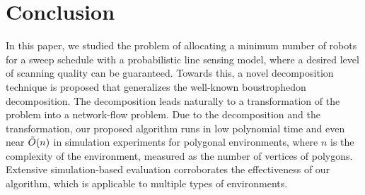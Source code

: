 \section{Conclusion }%

In this paper, we studied the problem of allocating a minimum number of robots for a sweep schedule with a probabilistic line sensing model, where a desired level of scanning quality can be guaranteed. 
Towards this, a novel decomposition technique is proposed that generalizes the well-known boustrophedon decomposition. The decomposition leads naturally to  a transformation of the problem into a network-flow problem. Due to the decomposition and the transformation, our proposed algorithm runs in low polynomial time and even near $\Tilde{O}(n)$ in simulation experiments for polygonal environments, where $n$ is the complexity of the environment, measured as the number of vertices of polygons. Extensive simulation-based evaluation corroborates the effectiveness of our algorithm, which is applicable to multiple types of environments.  


